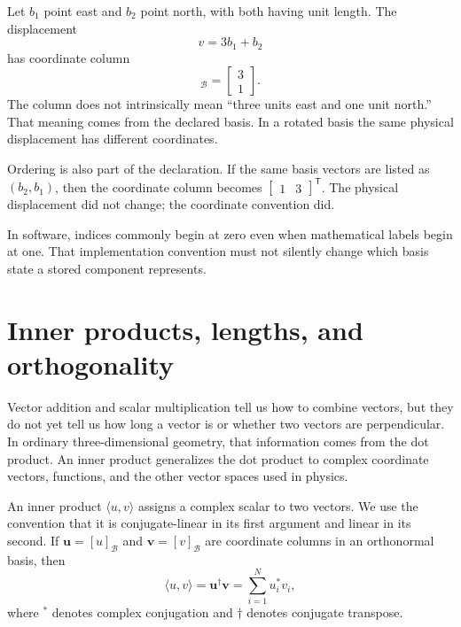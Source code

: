 Let \(b_1\) point east and \(b_2\) point north, with both having unit length.
The displacement
\begin{equation}
  v=3b_1+b_2
\end{equation}
has coordinate column
\begin{equation}
  [v]_{\mathcal B}
  =\begin{bmatrix}3\\1\end{bmatrix}.
\end{equation}
The column does not intrinsically mean ``three units east and one unit north.''
That meaning comes from the declared basis. In a rotated basis the same
physical displacement has different coordinates.

Ordering is also part of the declaration. If the same basis vectors are listed
as \((b_2,b_1)\), then the coordinate column becomes
\(\begin{bmatrix}1&3\end{bmatrix}^{\mathsf T}\). The physical displacement did
not change; the coordinate convention did.

In software, indices commonly begin at zero even when mathematical labels begin
at one. That implementation convention must not silently change which basis
state a stored component represents.

\section{Inner products, lengths, and orthogonality}

Vector addition and scalar multiplication tell us how to combine vectors, but
they do not yet tell us how long a vector is or whether two vectors are
perpendicular. In ordinary three-dimensional geometry, that information comes
from the dot product. An inner product generalizes the dot product to complex
coordinate vectors, functions, and the other vector spaces used in physics.

\begin{definition}
An inner product \(\langle u,v\rangle\) assigns a complex scalar to two
vectors. We use the convention that it is conjugate-linear in its first
argument and linear in its second. If
\(\mathbf u=[u]_{\mathcal B}\) and
\(\mathbf v=[v]_{\mathcal B}\) are coordinate columns in an orthonormal basis,
then
\begin{equation}
  \langle u,v\rangle
  =\mathbf u^{\dagger}\mathbf v
  =\sum_{i=1}^{N}u_i^*v_i,
  \label{eq:training-coordinate-inner-product}
\end{equation}
where \(^*\) denotes complex conjugation and \(\dagger\) denotes conjugate
transpose.
\end{definition}


